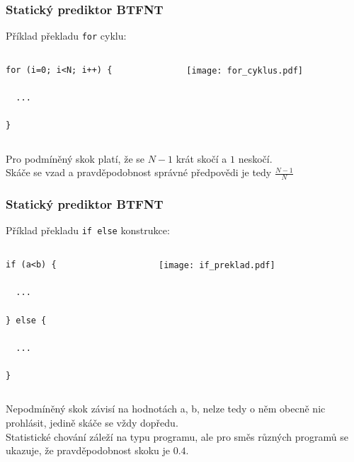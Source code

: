 \documentclass{beamer}
\begin{document}
\begin{frame}[fragile]
\frametitle{Statický prediktor BTFNT}

Příklad překladu \texttt{for} cyklu:

\begin{columns}[T]
\begin{column}{0.4\textwidth}
\begin{verbatim}
for (i=0; i<N; i++) {

  ...
  
}
\end{verbatim}
\end{column}
\begin{column}{0.6\textwidth}
\texttt{[image: for\_cyklus.pdf]}
\end{column}
\end{columns}
\bigskip
Pro podmíněný skok platí, že se $N-1$ krát skočí a $1$ neskočí.\\
Skáče se vzad a pravděpodobnost správné předpovědi je tedy $\frac{N-1}{N}$

\end{frame}

\begin{frame}[fragile]
\frametitle{Statický prediktor BTFNT}

Příklad překladu \texttt{if else} konstrukce:

\begin{columns}[T]
\begin{column}{0.4\textwidth}
\begin{verbatim}
if (a<b) {
  
  ...

} else {

  ...

}
\end{verbatim}
\end{column}
\begin{column}{0.6\textwidth}
\texttt{[image: if\_preklad.pdf]}
\end{column}
\end{columns}
\bigskip
Nepodmíněný skok závisí na hodnotách a, b, nelze tedy o něm obecně nic prohlásit, jedině skáče se vždy dopředu.\\
Statistické chování záleží na typu programu, ale pro směs různých programů se ukazuje, že pravděpodobnost skoku je $0.4$.

\end{frame}
\end{document}
